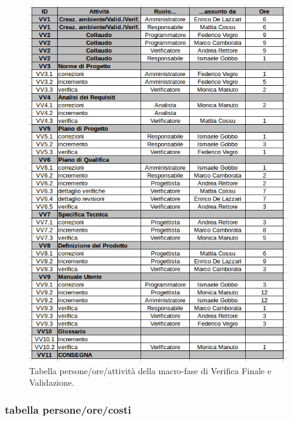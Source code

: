 \begin{figure}[h]
\begin{center}
\includegraphics[scale=0.60]{img/verival-attivita.png}
\caption{Tabella persone/ore/attività della macro-fase di Verifica Finale e Validazione.}
\end{center}
\end{figure}
\clearpage

\subsubsection{tabella persone/ore/costi}

